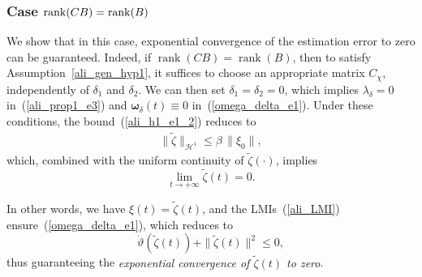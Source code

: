 \documentclass{ifacconf}
\def\eqref#1{(\ref{#1})}
\def\rank{\mathop{{\rm rank}}}
\def\rank{\mathop{{\rm rank}}}
\begin{document}
{\subsubsection{Case $\rank(CB) =\rank(B)$}
%
\vspace*{-0.2cm}
%
We show that in this case, exponential convergence of the estimation error to zero can be guaranteed. 
Indeed, if $\operatorname{rank}(CB) = \operatorname{rank}(B)$, then to satisfy Assumption~\ref{ali_gen_hyp1}, it suffices to choose an appropriate matrix $C_{\chi}$, independently of $\delta_1$ and $\delta_2$. 
We can then set $\delta_1 = \delta_2 = 0$, which implies $\lambda_\delta = 0$ in~\eqref{ali_prop1_e3} and $\bm{\omega}_\delta(t) \equiv 0$ in~\eqref{omega_delta_e1}. Under these conditions, the bound~\eqref{ali_h1_e1_2} reduces to
\begin{align}\label{ali_syst3_e6}
\| \tilde{\zeta} \|_{\mathcal{H}^{1}} \le \beta \, \|\xi_0\|,
\end{align}
which, combined with the uniform continuity of $\tilde{\zeta}(\cdot)$, implies
\[
\lim_{t \to +\infty} \tilde{\zeta}(t) = 0.
\]

In other words, we have $\xi(t) = \tilde{\zeta}(t)$, and the LMIs~\eqref{ali_LMI} ensure~\eqref{omega_delta_e1}, which reduces to
\begin{equation*}\label{omega_delta_e1_reduce}
\dot{\vartheta}(\tilde{\zeta}(t)) + \|\tilde{\zeta}(t)\|^2 \le 0,
\end{equation*}
thus guaranteeing the \emph{exponential convergence of $\tilde{\zeta}(t)$ to zero}.





}
\end{document}
